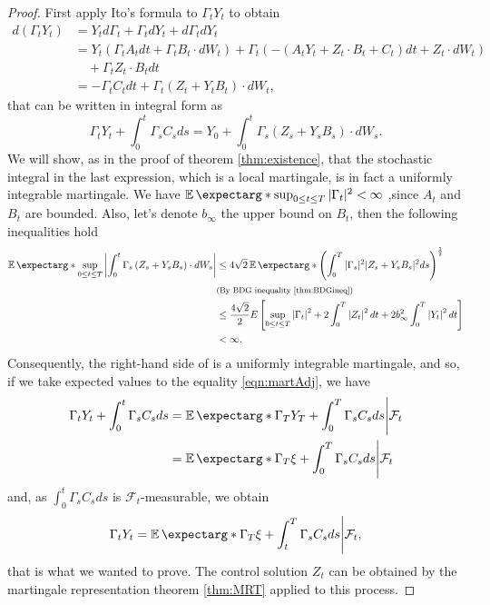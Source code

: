 \begin{proof}
	First apply Ito's formula to $\Gamma_t Y_t$ to obtain
	\begin{equation}
		\begin{split}
			d(\Gamma_t Y_t)&=Y_t d\Gamma_t +\Gamma_t dY_t +d\Gamma_t dY_t\\
			&=Y_t(\Gamma_t A_t dt +\Gamma_t B_t\cdot dW_t)+\Gamma_t(-(A_tY_t+Z_t\cdot B_t+C_t)dt+Z_t\cdot dW_t)\\
			& \quad+\Gamma_t Z_t \cdot B_t dt\\
			&=-\Gamma_t C_t dt+\Gamma_t (Z_t+Y_t B_t)\cdot dW_t,
		\end{split}
	\end{equation}
that can be written in integral form as 
\begin{equation}
	\label{eqn:martAdj}
	\Gamma_t Y_t+\int_0^t \Gamma_s C_s d s=Y_0+\int_0^t \Gamma_s\left(Z_s+Y_s B_s\right) \cdot d W_s.
\end{equation}
We will show, as in the proof of theorem \ref{thm:existence}, that the stochastic integral  in the last expression, which is a local martingale, is in fact a uniformly integrable martingale. We have $\expect*{\sup_{0\leq t \leq T}|\Gamma_t|^2}<\infty$ ,since $A_t$ and $B_t$ are bounded. Also, let's denote $b_\infty$ the upper bound on $B_t$, then the following inequalities hold 
\begin{equation}
	\begin{split}
		\expect*{\sup_{0\leq t \leq T}\left|\int_0^t \Gamma_s\left(Z_s+Y_s B_s\right) \cdot d W_s\right|}&\leq 4\sqrt{2} \expect*{\left(\int_{0}^{T}|\Gamma_s|^2 |Z_s+Y_s B_s|^2 ds\right)^{\frac{1}{2}}} \\
		&\text{{\footnotesize (By BDG inequality \ref{thm:BDGineq})}}\\
		& \leq \frac{4\sqrt{2}}{2} E\left[\sup_{0\leq t \leq T}\left|\Gamma_t\right|^2+2 \int_0^T\left|Z_t\right|^2 d t+2 b_{\infty}^2 \int_0^T\left|Y_t\right|^2 d t\right]\\
		&<\infty.
	\end{split}
\end{equation}
Consequently, the right-hand side of is a uniformly integrable martingale, and so, if we take expected values to the equality \eqref{eqn:martAdj}, we have
\begin{equation}
	\begin{split}
		\Gamma_t Y_t+\int_0^t \Gamma_s C_s d s & =\expect*{\Gamma_T Y_T+\int_0^T \Gamma_s C_s d s \Bigg| \mathcal{F}_t} \\
		& =\expect*{\Gamma_T \xi+\int_0^T \Gamma_s C_s d s \Bigg| \mathcal{F}_t}
	\end{split}
\end{equation} 
and, as $\int_0^t \Gamma_s C_s d s$ is $\mathcal{F}_t$-measurable, we obtain
\begin{equation}
		\Gamma_t Y_t =\expect*{\Gamma_T \xi+\int_t^T \Gamma_s C_s d s \Bigg| \mathcal{F}_t},
\end{equation}
that is what we wanted to prove. The control solution $Z_t$ can be obtained by the martingale representation theorem \ref{thm:MRT} applied to this process.
\end{proof}


